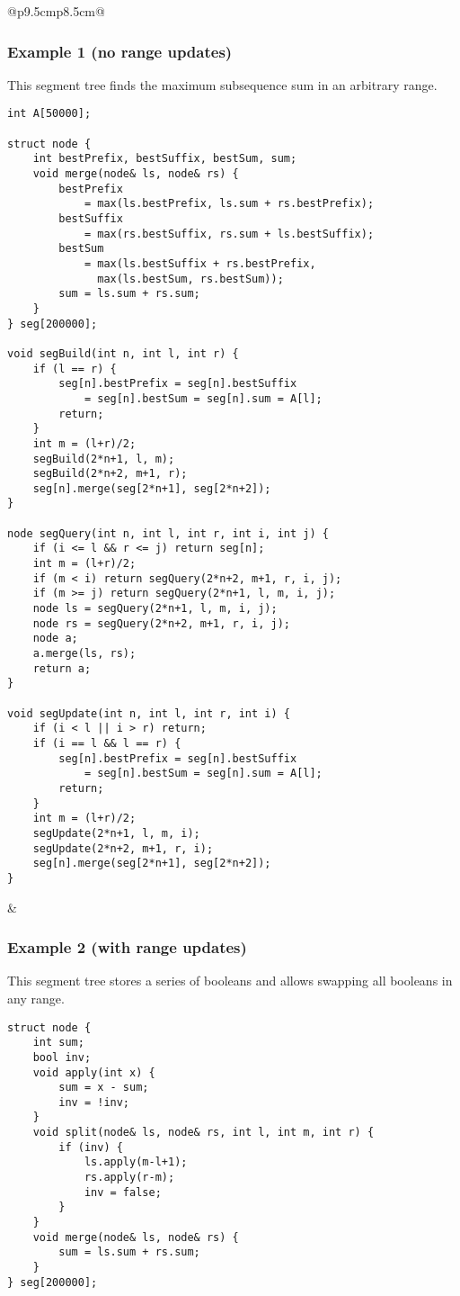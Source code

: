 \documentclass[letterpaper]{article}
\begin{document}
\begin{tabular}{@{}p{9.5cm}p{8.5cm}@{}}
\subsubsection{Example 1 (no range updates)}
This segment tree finds the maximum subsequence sum in an arbitrary range.

\begin{lstlisting}
int A[50000];

struct node {
	int bestPrefix, bestSuffix, bestSum, sum;
	void merge(node& ls, node& rs) {
		bestPrefix
			= max(ls.bestPrefix, ls.sum + rs.bestPrefix);
		bestSuffix
			= max(rs.bestSuffix, rs.sum + ls.bestSuffix);
		bestSum
			= max(ls.bestSuffix + rs.bestPrefix,
			  max(ls.bestSum, rs.bestSum));
		sum = ls.sum + rs.sum;
	}
} seg[200000];

void segBuild(int n, int l, int r) {
	if (l == r) {
		seg[n].bestPrefix = seg[n].bestSuffix
			= seg[n].bestSum = seg[n].sum = A[l];
		return;
	}
	int m = (l+r)/2;
	segBuild(2*n+1, l, m);
	segBuild(2*n+2, m+1, r);
	seg[n].merge(seg[2*n+1], seg[2*n+2]);
}

node segQuery(int n, int l, int r, int i, int j) {
	if (i <= l && r <= j) return seg[n];
	int m = (l+r)/2;
	if (m < i) return segQuery(2*n+2, m+1, r, i, j);
	if (m >= j) return segQuery(2*n+1, l, m, i, j);
	node ls = segQuery(2*n+1, l, m, i, j);
	node rs = segQuery(2*n+2, m+1, r, i, j);
	node a;
	a.merge(ls, rs);
	return a;
}

void segUpdate(int n, int l, int r, int i) {
	if (i < l || i > r) return;
	if (i == l && l == r) {
		seg[n].bestPrefix = seg[n].bestSuffix
			= seg[n].bestSum = seg[n].sum = A[l];
		return;
	}
	int m = (l+r)/2;
	segUpdate(2*n+1, l, m, i);
	segUpdate(2*n+2, m+1, r, i);
	seg[n].merge(seg[2*n+1], seg[2*n+2]);
}
\end{lstlisting}
&
\subsubsection{Example 2 (with range updates)}

This segment tree stores a series of booleans and allows swapping all booleans in any range.

\begin{lstlisting}
struct node {
	int sum;
	bool inv;
	void apply(int x) {
		sum = x - sum;
		inv = !inv;
	}
	void split(node& ls, node& rs, int l, int m, int r) {
		if (inv) {
			ls.apply(m-l+1);
			rs.apply(r-m);
			inv = false;
		}
	}
	void merge(node& ls, node& rs) {
		sum = ls.sum + rs.sum;
	}
} seg[200000];


\end{lstlisting}
\end{tabular}
\end{document}

